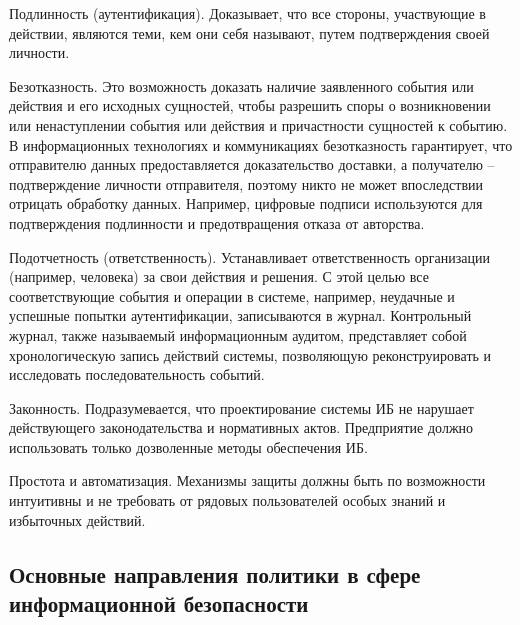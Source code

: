 Подлинность (аутентификация). Доказывает, что все стороны, участвующие в действии, являются теми, кем они себя называют, путем подтверждения своей личности.

Безотказность. Это возможность доказать наличие заявленного
события или действия и его исходных сущностей, чтобы разрешить споры о
возникновении или ненаступлении события или действия и причастности
сущностей к событию. В информационных технологиях и коммуникациях
безотказность гарантирует, что отправителю данных предоставляется
доказательство доставки, а получателю – подтверждение личности
отправителя, поэтому никто не может впоследствии отрицать обработку
данных. Например, цифровые подписи используются для подтверждения
подлинности и предотвращения отказа от авторства.

Подотчетность (ответственность). Устанавливает ответственность
организации (например, человека) за свои действия и решения. С этой целью
все соответствующие события и операции в системе, например, неудачные и
успешные попытки аутентификации, записываются в журнал. Контрольный
журнал, также называемый информационным аудитом, представляет собой
хронологическую запись действий системы, позволяющую реконструировать
и исследовать последовательность событий.

Законность. Подразумевается, что проектирование системы ИБ не
нарушает действующего законодательства и нормативных актов. Предприятие
должно использовать только дозволенные методы обеспечения ИБ.

Простота и автоматизация. Механизмы защиты должны быть по
возможности интуитивны и не требовать от рядовых пользователей особых
знаний и избыточных действий.

\subsection{Основные направления политики в сфере информационной безопасности}
\label{subsec:mechanisms:directions}

